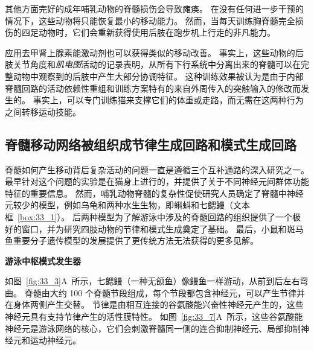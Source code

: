 其他方面完好的成年哺乳动物的脊髓损伤会导致瘫痪。
在没有任何进一步干预的情况下，这些动物将只能恢复最小的移动能力。
然而，当每天训练胸脊髓完全损伤的四足动物时，它们会重新获得使用后肢在跑步机上行走的非凡能力。


应用去甲肾上腺素能激动剂也可以获得类似的移动改善。
事实上，这些动物的后肢关节角度和\textit{肌电图}活动的记录表明，从所有下行系统中分离出来的脊髓可以在完整动物中观察到的后肢中产生大部分协调特征。
这种训练效果被认为是由于内部脊髓回路的活动依赖性重组和训练方案特有的来自外周传入的突触输入的修改而发生的。
事实上，可以专门训练猫来支撑它们的体重或走路，而无需在这两种行为之间转移运动技能。



\subsection{脊髓移动网络被组织成节律生成回路和模式生成回路}

脊髓如何产生移动背后复杂活动的问题一直是遵循三个互补通路的深入研究之一。
最早针对这个问题的实验是在猫身上进行的，并提供了关于不同神经元间群体功能特征的重要信息。
然而，哺乳动物脊髓的复杂性促使研究人员确定了脊髓中神经元较少的模型，例如乌龟和两种水生生物，即蝌蚪和七鳃鳗（文本框~\ref{box:33_1}）。
后两种模型为了解游泳中涉及的脊髓回路的组织提供了一个极好的窗口，并为研究四肢动物的节律和模式生成奠定了基础。
最后，小鼠和斑马鱼重要分子遗传模型的发展提供了更传统方法无法获得的更多见解。


\textbf{游泳中枢模式发生器}

如图~\ref{fig:33_3}A~所示，七鳃鳗（一种无颌鱼）像鳗鱼一样游动，从前到后左右弯曲。
脊髓由大约 100 个脊髓节段组成，每个节段都包含神经元，可以产生节律并在身体两侧产生交替。
节律是由相互连接的谷氨酸能兴奋性神经元产生的，这些神经元具有支持节律产生的活性膜特性。
如图~\ref{fig:33_7}A~所示，这些谷氨酸能神经元是游泳网络的核心，它们会刺激脊髓同一侧的连合抑制神经元、局部抑制神经元和运动神经元。


